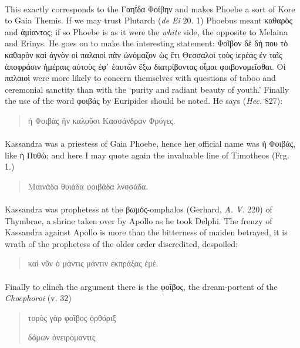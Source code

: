 \documentclass[a4paper, 11pt, oneside, polutonikogreek, english]{article}
\begin{document}
\paragraph{}
This exactly corresponds to the Γαηΐδα Φοίβην and makes Phoebe a sort of Kore to Gaia Themis. If we may trust Plutarch (\emph{de Ei} 20. 1) Phoebus meant καθαρὸς and ἀμίαντος; if so Phoebe is as it were the \emph{white} side, the opposite to Melaina and Erinys. He goes on to make the interesting statement: Φοῖβον δὲ δή που τὸ καθαρὸν καὶ ἁγνὸν οἱ παλαιοὶ πᾶν ὠνόμαζον ὡς ἔτι Θεσσαλοὶ τοὺς ἱερέας ἐν ταῖς ἀποφράσιν ἡμέραις αὐτοὺς ἐφ᾽ ἑαυτῶν ἔξω διατρίβοντας οἶμαι φοιβονομεῖσθαι. Οἱ παλαιοὶ were more likely to concern themselves with questions of taboo and ceremonial sanctity than with the `purity and radiant beauty of youth.' Finally the use of the word φοιβάς by Euripides should be noted. He says (\emph{Hec.} 827):
\begin{quotation}
ἡ Φοιβὰς ἣν καλοῦσι Κασσάνδραν Φρύγες.
\end{quotation}
\paragraph{}
Kassandra was a priestess of Gaia Phoebe, hence her official name was ἡ Φοιβάς, like ἡ Πυθώ; and here I may quote again the invaluable line of Timotheos (Frg. 1.)
\begin{quotation}
Μαινάδα θυιάδα φοιβάδα λνσσάδα.
\end{quotation}
\paragraph{}
Kassandra was prophetess at the βωμός-omphalos (Gerhard, \emph{A. V.} 220) of Thymbrae, a shrine taken over by Apollo as he took Delphi. The frenzy of Kassandra against Apollo is more than the bitterness of maiden betrayed, it is wrath of the prophetess of the older order discredited, despoiled:
\begin{quotation}
καὶ νῦν ὀ μάντις μάντιν ἐκπράξας ἐμέ.
\end{quotation}
\paragraph{}
Finally to clinch the argument there is the φοῖβος, the dream-portent of the \emph{Choephoroi} (v. 32)
\begin{quotation}
τορὸς γὰρ φοῖβος ὀρθόριξ

δόμων ὀνειρόμαντις
\end{quotation}
\end{document}
